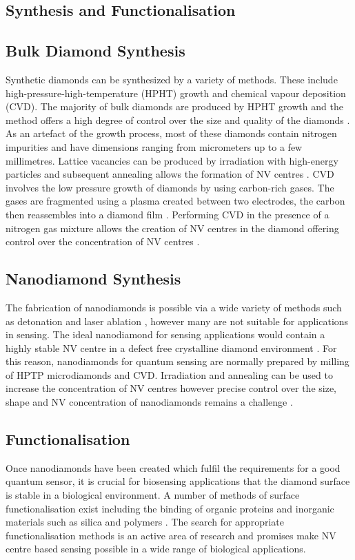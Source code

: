 \documentclass[10pt]{article}
\begin{document}
\begin{multicols}{2}
\section{Synthesis and Functionalisation}
\subsection{Bulk Diamond Synthesis}
Synthetic diamonds can be synthesized by a variety of methods. These include high-pressure-high-temperature (HPHT) growth and chemical vapour deposition (CVD). The majority of bulk diamonds are produced by HPHT growth and the method offers a high degree of control over the size and quality of the diamonds \cite{wu2016diamond}. As an artefact of the growth process, most of these diamonds contain nitrogen impurities and have dimensions ranging from micrometers up to a few millimetres. Lattice vacancies can be produced by irradiation with high-energy particles and subsequent annealing allows the formation of NV centres \cite{wu2016diamond}. CVD involves the low pressure growth of diamonds by using carbon-rich gases. The gases are fragmented using a plasma created between two electrodes, the carbon then reassembles into a diamond film \cite{wu2016diamond}. Performing CVD in the presence of a nitrogen gas mixture allows the creation of NV centres in the diamond offering control over the concentration of NV centres \cite{wu2016diamond}. 

\subsection{Nanodiamond Synthesis}
The fabrication of nanodiamonds is possible via a wide variety of methods such as detonation \cite{shenderova2012ultrananocrystalline}and laser ablation \cite{amans2009nanodiamond}, however many are not suitable for applications in sensing. The ideal nanodiamond for sensing applications would contain a highly stable NV centre in a defect free crystalline diamond environment \cite{wu2016diamond}. For this reason, nanodiamonds for quantum sensing are normally prepared by milling of HPTP microdiamonds and CVD. Irradiation and annealing can be used to increase the concentration of NV centres however precise control over the size, shape and NV concentration of nanodiamonds remains a challenge \cite{wu2016diamond}. 

\subsection{Functionalisation}
Once nanodiamonds have been created which fulfil the requirements for a good quantum sensor, it is crucial for biosensing applications that the diamond surface is stable in a biological environment. A number of methods of surface functionalisation exist including the binding of organic proteins and inorganic materials such as silica and polymers \cite{wu2016diamond}. The search for appropriate functionalisation methods is an active area of research and promises make NV centre based sensing possible in a wide range of biological applications.  



\end{multicols}
\end{document}
